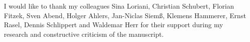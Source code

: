 %
%
I would like to thank my colleagues Sina Loriani, Christian Schubert, Florian Fitzek, Sven Abend, Holger Ahlers, Jan-Niclas Siem{\ss}, Klemens Hammerer, Ernst Rasel, Dennis Schlippert and Waldemar Herr for their support during my research and constructive criticism of the manuscript.
%